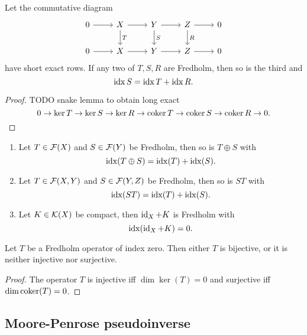 \begin{lemma}
Let the commutative diagram
\[ \begin{tikzcd}
0 \rar & X \dar{T} \rar & Y \dar{S} \rar & Z \dar{R} \rar & 0 \\
0 \rar & X \rar & Y \rar & Z \rar & 0
\end{tikzcd} \]
have short exact rows. If any two of $T,S,R$ are Fredholm, then so is the third and
\[ \operatorname{idx} S = \operatorname{idx} T + \operatorname{idx} R. \]
\end{lemma}
\begin{proof}
TODO snake lemma to obtain long exact
\[ 0\to \ker T \to \ker S\to \ker R \to \operatorname{coker} T \to \operatorname{coker} S \to \operatorname{coker} R \to 0. \]
\end{proof}
\begin{corollary} \mbox{}
\begin{enumerate} 
\item Let $T\in\operatorname{\mathcal{F}}(X)$ and $S\in\operatorname{\mathcal{F}}(Y)$ be Fredholm, then so is $T\oplus S$ with
\[ \operatorname{idx}(T\oplus S) = \operatorname{idx}(T)+\operatorname{idx}(S). \]
\item Let $T\in\operatorname{\mathcal{F}}(X,Y)$ and $S\in\operatorname{\mathcal{F}}(Y,Z)$ be Fredholm, then so is $ST$ with
\[ \operatorname{idx}(ST) = \operatorname{idx}(T)+\operatorname{idx}(S). \]
\item Let $K\in\operatorname{\mathcal{K}}(X)$ be compact, then $\operatorname{id}_X+K$ is Fredholm with
\[ \operatorname{idx}(\operatorname{id}_X+K) = 0. \]
\end{enumerate}
\end{corollary}


\begin{lemma} \label{FredholmAlternative}
Let $T$ be a Fredholm operator of index zero. Then either $T$ is bijective, or it is neither injective nor surjective.
\end{lemma}
\begin{proof}
The operator $T$ is injective iff $\dim\ker(T) = 0$ and surjective iff $\dim\operatorname{coker}(T) = 0$.
\end{proof}

\subsection{Moore-Penrose pseudoinverse}

